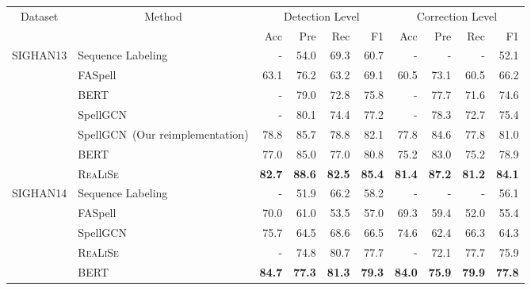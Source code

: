 \documentclass[11pt,a4paper]{article}
\newcommand\model{\textsc{ReaLiSe}}
\begin{document}
\begin{table*}[th]
\small
\centering

\begin{tabular}{@{}c|l|rrrr|rrrr@{}}
\toprule
\multirow{2}{*}{Dataset} & \multicolumn{1}{c|}{\multirow{2}{*}{Method}} & \multicolumn{4}{c|}{Detection Level} & \multicolumn{4}{c}{Correction Level} \\
 & \multicolumn{1}{c|}{} & Acc & Pre & Rec & F1 & Acc & Pre & Rec & F1 \\ \midrule
 
\multicolumn{1}{l|}{\multirow{6}{*}{SIGHAN13}} & Sequence Labeling~\citep{spell-corpus} & - & 54.0 & 69.3 & 60.7 & - & - & - & 52.1 \\
\multicolumn{1}{l|}{} & FASpell~\citep{FASPell} & 63.1 & 76.2 & 63.2 & 69.1 & 60.5 & 73.1 & 60.5 & 66.2 \\
\multicolumn{1}{l|}{} & BERT~\citep{spellgcn} & - & 79.0 & 72.8 & 75.8 & - & 77.7 & 71.6 & 74.6 \\
\multicolumn{1}{l|}{} & SpellGCN~\citep{spellgcn} & - & 80.1 & 74.4 & 77.2 & - & 78.3 & 72.7 & 75.4 \\ 
\multicolumn{1}{l|}{} & SpellGCN~(Our reimplementation) & 78.8 & 85.7 & 78.8 & 82.1 & 77.8 & 84.6 & 77.8 & 81.0 \\ 
\cmidrule(l){2-10} 
\multicolumn{1}{l|}{} & BERT & 77.0 & 85.0 & 77.0 & 80.8 & 75.2 & 83.0 & 75.2 & 78.9 \\
\multicolumn{1}{l|}{} & \model{} & \textbf{82.7} & \textbf{88.6} & \textbf{82.5} & \textbf{85.4} & \textbf{81.4} & \textbf{87.2} & \textbf{81.2} & \textbf{84.1} \\ 

\midrule

\multicolumn{1}{l|}{\multirow{6}{*}{SIGHAN14}} & Sequence Labeling~\citep{spell-corpus} & - & 51.9 & 66.2 & 58.2 & - & - & - & 56.1 \\
\multicolumn{1}{l|}{} & FASpell~\citep{FASPell} & 70.0 & 61.0 & 53.5 & 57.0 & 69.3 & 59.4 & 52.0 & 55.4 \\
\multicolumn{1}{l|}{} & SpellGCN & 75.7 & 64.5 & 68.6 & 66.5 & 74.6 & 62.4 & 66.3 & 64.3 \\
\multicolumn{1}{l|}{} & \model{}~\citep{spellgcn} & - & 74.8 & 80.7 & 77.7 & - & 72.1 & 77.7 & 75.9 \\ \cmidrule(l){2-10} 
 & BERT & \textbf{84.7} & \textbf{77.3} & \textbf{81.3} & \textbf{79.3} & \textbf{84.0} & \textbf{75.9} & \textbf{79.9} & \textbf{77.8} \\

\bottomrule
\end{tabular}

\caption{The performance of our model and all baseline models on SIGHAN test sets.
The ``" symbol means we apply  post-processing (Section~\ref{ssec:details}) to the model outputs on SIGHAN13. Results of \model{} on all SIGHAN test sets outperforms all the corresponding baselines with a significance level .}
\label{tab:score}
\end{table*} 
\end{document}
